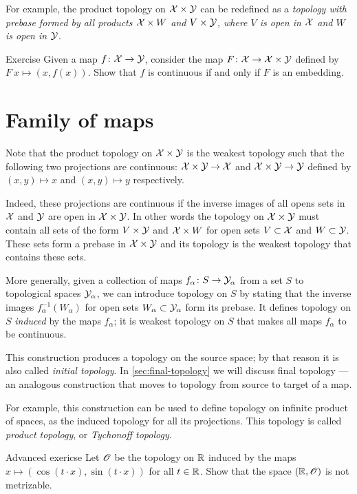 For example, the product topology on $\mathcal{X}\times\mathcal{Y}$ can be redefined as a \textit{topology with prebase formed by all products $\mathcal{X}\times W$ and $V\times \mathcal{Y}$, where $V$ is open in $\mathcal{X}$ and $W$ is open in $\mathcal{Y}$}.


\begin{thm}{Exercise}\label{ex:graph}
Given a map $f\:\c{X}\z\to \c{Y}$, consider the map $F\:\c{X}\z\to \c{X}\times\c{Y}$ defined by $F\:x\mapsto (x,f(x))$.
Show that $f$ is continuous if and only if $F$ is an embedding.
\end{thm}

\section{Family of maps}\label{induced-family}

Note that the product topology on $\mathcal{X}\times\mathcal{Y}$ is the weakest topology such that the following two projections are continuous:
$\mathcal{X}\times\mathcal{Y}\to \mathcal{X}$ and $\mathcal{X}\times\mathcal{Y}\to \mathcal{Y}$ defined by $(x,y)\mapsto x$ and $(x,y)\mapsto y$ respectively.

Indeed, these projections are continuous if the inverse images of all opens sets in $\mathcal{X}$ and $\mathcal{Y}$ are open in $\mathcal{X}\times\mathcal{Y}$.
In other words the topology on $\mathcal{X}\times\mathcal{Y}$ must contain all sets of the form $V\times \mathcal{Y}$ and $\mathcal{X}\times W$ for open sets $V\subset \mathcal{X}$ and $W\subset \mathcal{Y}$.
These sets form a prebase in $\mathcal{X}\times\mathcal{Y}$ and its topology is the weakest topology  that contains these sets.

More generally, given a collection of maps $f_\alpha\colon S\to \mathcal{Y}_\alpha$ from a set $S$ to topological spaces $\mathcal{Y}_\alpha$, we can introduce topology on $S$ by stating that the inverse images $f^{-1}_\alpha(W_\alpha)$ for open sets $W_\alpha\subset\mathcal{Y}_\alpha$ form its prebase.
It defines topology on $S$ \emph{induced} by the maps $f_\alpha$;
it is weakest topology on $S$ that makes all maps $f_\alpha$ to be continuous.

This construction produces a topology on the source space;
by that reason it is also called \emph{initial topology}.
In \ref{sec:final-topology} we will discuss final topology --- an analogous construction that moves to topology from source to target of a map.

For example, this construction can be used to define topology on infinite product of spaces, as the induced topology for all its projections.
This topology is called \emph{product topology}, or \emph{Tychonoff topology}.

\begin{thm}{Advanced exericse}\label{ex:induced-nonmetrizable}
Let $\mathscr{O}$ be the topology on $\mathbb{R}$ induced by the maps $x\mapsto (\cos(t\cdot x),\sin(t\cdot x))$ for all $t\in \mathbb{R}$.
Show that the space $(\mathbb{R},\mathscr{O})$ is not metrizable.
\end{thm}

